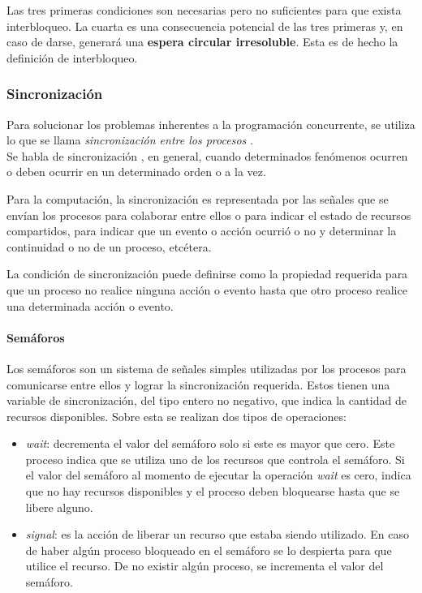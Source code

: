 Las tres primeras condiciones son necesarias pero no suficientes para que exista interbloqueo.
La cuarta es una consecuencia potencial de las tres primeras y, en caso de darse, generará una \textbf{espera circular irresoluble}. Esta es de hecho la definición de interbloqueo.

\subsubsection{Sincronización}
Para solucionar los problemas inherentes a la programación concurrente, se utiliza lo que se llama \textit{sincronización entre los procesos} . \\
Se habla de sincronización , en general, cuando determinados fenómenos ocurren o deben ocurrir en un determinado orden o a la vez.
\par Para la computación, la sincronización es representada por las señales que se envían los procesos para colaborar entre ellos o para indicar el estado de recursos compartidos, para indicar que un evento o acción ocurrió o no y determinar la continuidad o no de un proceso, etcétera.
\par La condición de sincronización puede definirse como la propiedad requerida para que un proceso no realice ninguna acción o evento hasta que otro proceso realice una determinada acción o evento.

\paragraph{Semáforos}
Los semáforos son un sistema de señales simples utilizadas por los procesos para comunicarse entre ellos y lograr la sincronización requerida.
Estos tienen una variable de sincronización, del tipo entero no negativo, que indica la cantidad de recursos disponibles. Sobre esta se realizan dos tipos de operaciones:

\begin{itemize}
    \item \textit{wait}: decrementa el valor del semáforo solo si este es mayor que cero. Este proceso indica que se utiliza uno de los recursos que controla el semáforo. Si el valor del semáforo al momento de ejecutar la operación \textit{wait} es cero, indica que no hay recursos disponibles y el proceso deben bloquearse hasta que se libere alguno.
    \item \textit{signal}: es la acción de liberar un recurso que estaba siendo utilizado. En caso de haber algún proceso bloqueado en el semáforo se lo despierta para que utilice el recurso. De no existir algún proceso, se incrementa el valor del semáforo.
\end{itemize}

